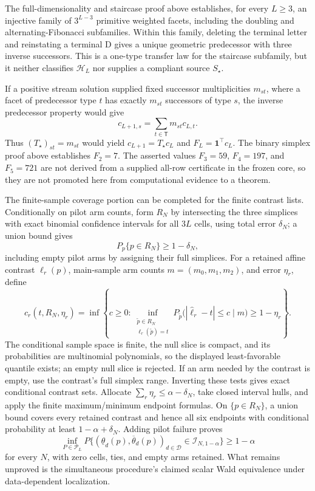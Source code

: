 The full-dimensionality and staircase proof above establishes, for every \(L\ge3\), an injective family of \(3^{L-3}\) primitive weighted facets, including the doubling and alternating-Fibonacci subfamilies.  Within this family, deleting the terminal letter and reinstating a terminal \(\mathrm D\) gives a unique geometric predecessor with three inverse successors.  This is a one-type transfer law for the staircase subfamily, but it neither classifies \(\mathcal H_L\) nor supplies a compliant source \(S_\star\).

If a positive stream solution supplied fixed successor multiplicities \(m_{st}\), where a facet of predecessor type \(t\) has exactly \(m_{st}\) successors of type \(s\), the inverse predecessor property would give
\[
 c_{L+1,s}=\sum_{t\in\mathsf T}m_{st}c_{L,t}.
\]
Thus \((T_\star)_{st}=m_{st}\) would yield \(c_{L+1}=T_\star c_L\) and \(F_L=\mathbf 1^\top c_L\).  The binary simplex proof above establishes \(F_2=7\).  The asserted values \(F_3=59\), \(F_4=197\), and \(F_5=721\) are not derived from a supplied all-row certificate in the frozen core, so they are not promoted here from computational evidence to a theorem.

The finite-sample coverage portion can be completed for the finite contrast lists.  Conditionally on pilot arm counts, form \(R_N\) by intersecting the three simplices with exact binomial confidence intervals for all \(3L\) cells, using total error \(\delta_N\); a union bound gives
\[
 P_p\{p\in R_N\}\ge1-\delta_N,
\]
including empty pilot arms by assigning their full simplices.  For a retained affine contrast \(\ell_r(p)\), main-sample arm counts \(m=(m_0,m_1,m_2)\), and error \(\eta_r\), define
\[
 c_r(t,R_N,\eta_r)=\inf\left\{c\ge0:
 \inf_{\substack{\widetilde p\in R_N\\ \ell_r(\widetilde p)=t}}
 P_{\widetilde p}\bigl(|\widehat\ell_r-t|\le c\mid m\bigr)
 \ge1-\eta_r\right\}.
\]
The conditional sample space is finite, the null slice is compact, and its probabilities are multinomial polynomials, so the displayed least-favorable quantile exists; an empty null slice is rejected.  If an arm needed by the contrast is empty, use the contrast's full simplex range.  Inverting these tests gives exact conditional contrast sets.  Allocate \(\sum_r\eta_r\le\alpha-\delta_N\), take closed interval hulls, and apply the finite maximum/minimum endpoint formulas.  On \(\{p\in R_N\}\), a union bound covers every retained contrast and hence all six endpoints with conditional probability at least \(1-\alpha+\delta_N\).  Adding pilot failure proves
\[
 \inf_{P\in\mathcal P_L}P\{(\underline\theta_d(p),\overline\theta_d(p))_{d\in\mathcal D}
 \in\mathcal I_{N,1-\alpha}\}\ge1-\alpha
\]
for every \(N\), with zero cells, ties, and empty arms retained.  What remains unproved is the simultaneous procedure's claimed scalar Wald equivalence under data-dependent localization.

